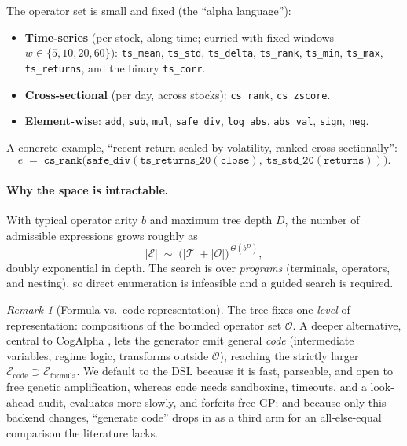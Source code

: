 \documentclass{article}
\theoremstyle{definition}
\theoremstyle{plain}
\theoremstyle{remark}
\newtheorem{remark}{Remark}[section]
\newcommand{\Expr}{\mathcal{E}}
\newcommand{\Term}{\mathcal{T}}
\newcommand{\Op}{\mathcal{O}}
\begin{document}
The operator set is small and fixed (the ``alpha language''):
\begin{itemize}[leftmargin=1.4em,itemsep=1pt]
  \item \textbf{Time-series} (per stock, along time; curried with fixed windows
  $w\in\{5,10,20,60\}$): \texttt{ts\_mean}, \texttt{ts\_std}, \texttt{ts\_delta},
  \texttt{ts\_rank}, \texttt{ts\_min}, \texttt{ts\_max}, \texttt{ts\_returns}, and the
  binary \texttt{ts\_corr}.
  \item \textbf{Cross-sectional} (per day, across stocks): \texttt{cs\_rank},
  \texttt{cs\_zscore}.
  \item \textbf{Element-wise}: \texttt{add}, \texttt{sub}, \texttt{mul},
  \texttt{safe\_div}, \texttt{log\_abs}, \texttt{abs\_val}, \texttt{sign}, \texttt{neg}.
\end{itemize}
A concrete example, ``recent return scaled by volatility, ranked cross-sectionally'':
\[
e \;=\; \texttt{cs\_rank}\big(\texttt{safe\_div}(\texttt{ts\_returns\_20}(\texttt{close}),\ \texttt{ts\_std\_20}(\texttt{returns}))\big).
\]

\paragraph{Why the space is intractable.} With typical operator arity $b$ and maximum
tree depth $D$, the number of admissible expressions grows roughly as
\begin{equation}
|\Expr| \;\sim\; \big(|\Term| + |\Op|\big)^{\,\Theta(b^{D})},
\label{eq:explosion}
\end{equation}
doubly exponential in depth. The search is over \emph{programs} (terminals, operators,
and nesting), so direct enumeration is infeasible and a guided search is required.

\begin{remark}[Formula vs.\ code representation]
The tree fixes one \emph{level} of representation: compositions of the bounded operator
set $\Op$. A deeper alternative, central to CogAlpha \cite{cogalpha}, lets the
generator emit general \emph{code} (intermediate variables, regime logic, transforms
outside $\Op$), reaching the strictly larger
$\Expr_{\text{code}}\supset\Expr_{\text{formula}}$. We default to the DSL because it is
fast, parseable, and open to free genetic amplification, whereas code needs sandboxing,
timeouts, and a look-ahead audit, evaluates more slowly, and forfeits free GP; and
because only this backend changes, ``generate code'' drops in as a third arm for an
all-else-equal comparison the literature lacks.
\end{remark}
\end{document}
